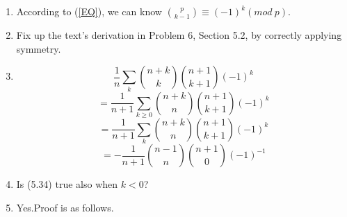 \documentclass[12pt,a4paper]{article}
\makeatletter
\newtheorem*{solution}{Solution}
\theoremstyle{definition}
\renewenvironment{solution}[1][Solution] {\par\pushQED{\qed}\normalfont\topsep6\p@\@plus6\p@\relax\trivlist\item[\hskip\labelsep\bfseries#1\@addpunct{.}]\ignorespaces}{\popQED\endtrivlist\@endpefalse} \makeatother
\makeatother
\begin{document}
\begin{enumerate}
\begin{solution}
        According to (\ref{EQ}), we can know $\binom{p}{k-1}\equiv (-1)^k(mod\ p)$.
    \end{solution}
    \item 
        Fix up the text's derivation in Problem 6, Section 5.2, by correctly applying symmetry.
        \begin{solution}
        	 \begin{equation*}
        	     \frac{1}{n} \sum_{k} \binom{n+k}{k} \binom{n+1}{k+1}(-1)^k
        	 \end{equation*}
        	 \begin{equation*}
        	     =\frac{1}{n+1} \sum_{k\ge 0} \binom{n+k}{n} \binom{n+1}{k+1}(-1)^k
        	 \end{equation*}
        	 \begin{equation*}
        	     =\frac{1}{n+1} \sum_{k} \binom{n+k}{n} \binom{n+1}{k+1}(-1)^k
        	 \end{equation*}
        	 \begin{equation*}
        	     =-\frac{1}{n+1} \binom{n-1}{n}\binom{n+1}{0}(-1)^{-1}
        	 \end{equation*}
        \end{solution}
    \item 
        Is (5.34) true also when $k<0$?
        \begin{solution}
            Yes.Proof is as follows.
            

\end{solution}
\end{enumerate}
\end{document}
